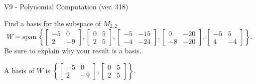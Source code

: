 \begin{exercise}
  \begin{exerciseTitle}V9 - Polynomial Computation (ver. 318)\end{exerciseTitle}
  \begin{exerciseStatement}
    Find a basis for the subspace of \(M_{2,2}\) 
\[W=\mathrm{span}\ \left\{\left[\begin{array}{cc}
-5 & 0 \\
2 & -9
\end{array}\right] , \left[\begin{array}{cc}
0 & 5 \\
2 & 5
\end{array}\right] , \left[\begin{array}{cc}
-5 & -15 \\
-4 & -24
\end{array}\right] , \left[\begin{array}{cc}
0 & -20 \\
-8 & -20
\end{array}\right] , \left[\begin{array}{cc}
-5 & 5 \\
4 & -4
\end{array}\right]\right\}.\]
 Be sure to explain why your result is a basis.


  \end{exerciseStatement}
  \begin{exerciseAnswer}
   A basis of \(W\) is  \(\left\{\left[\begin{array}{cc}
-5 & 0 \\
2 & -9
\end{array}\right] , \left[\begin{array}{cc}
0 & 5 \\
2 & 5
\end{array}\right]\right\}\).
  


  \end{exerciseAnswer}
\end{exercise}